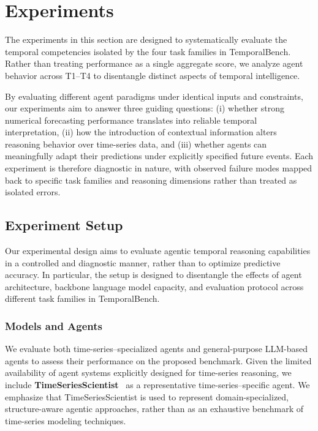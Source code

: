 \section{Experiments}

The experiments in this section are designed to systematically evaluate the temporal competencies isolated by the four task families in TemporalBench. Rather than treating performance as a single aggregate score, we analyze agent behavior across T1–T4 to disentangle distinct aspects of temporal intelligence.

By evaluating different agent paradigms under identical inputs and constraints, our experiments aim to answer three guiding questions: (i) whether strong numerical forecasting performance translates into reliable temporal interpretation, (ii) how the introduction of contextual information alters reasoning behavior over time-series data, and (iii) whether agents can meaningfully adapt their predictions under explicitly specified future events. Each experiment is therefore diagnostic in nature, with observed failure modes mapped back to specific task families and reasoning dimensions rather than treated as isolated errors.

\subsection{Experiment Setup}

Our experimental design aims to evaluate agentic temporal reasoning capabilities in a controlled and diagnostic manner, rather than to optimize predictive accuracy. In particular, the setup is designed to disentangle the effects of agent architecture, backbone language model capacity, and evaluation protocol across different task families in TemporalBench.

\subsubsection{Models and Agents}

We evaluate both time-series--specialized agents and general-purpose LLM-based agents to assess their performance on the proposed benchmark.
Given the limited availability of agent systems explicitly designed for time-series reasoning, we include \textbf{TimeSeriesScientist}~\cite{zhao2025timeseriesscientist} as a representative time-series--specific agent.
We emphasize that TimeSeriesScientist is used to represent domain-specialized, structure-aware agentic approaches, rather than as an exhaustive benchmark of time-series modeling techniques.

